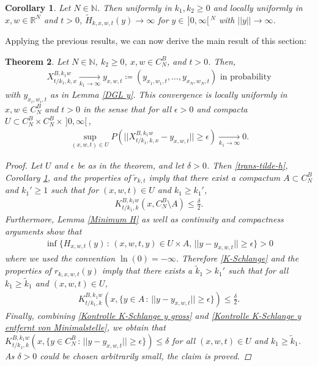 \documentclass[reqno]{amsart}
\theoremstyle{plain}
\newtheorem{theorem}{Theorem}[section]
\newtheorem{corollary}[theorem]{Corollary}
\theoremstyle{definition}
\numberwithin{equation}{section}
\newcommand{\R}{\mathbb{R}}
\newcommand{\N}{\mathbb{N}}
\begin{document}
\begin{corollary}\label{H-Schlange y gross}
Let $N \in \N$. Then uniformly in $k_1,k_2 \geq 0$ and locally uniformly in $x,w \in \R^N$ and $t>0$, 
$\widetilde{H}_{k,x,w,t}(y) \to \infty$ for $y \in \,]0,\infty[\,^N$ with $||y|| \to \infty$.
\end{corollary}


Applying the previous results, we can now derive the main result of this section:


\begin{theorem}\label{schwacher Limes K-Schlange}
Let $N \in \N$,  $k_2 \geq 0$, $x,w \in C_N^B$, and $t >0$. Then, 
\begin{align*}
X_{t/k_1,k,x}^{B,k_1 w} \xrightarrow[k_1 \to \infty]{} y_{x,w,t} \coloneqq (y_{x_1,w_1,t}, \ldots, y_{x_N,w_N,t}) \text{ in probability}
\end{align*}
with $y_{x_i,w_i,t}$ as  in Lemma \ref{DGL y}.
This convergence is locally uniformly in $x,w \in C_N^B$ and $t>0$ in the sense that
 for all $\epsilon>0$ and  compacta $U \subset C_N^B \times C_N^B \times \,]0,\infty[\,$,
\begin{align*}
\sup\limits_{(x,w,t) \in U} P(||X_{t/k_1,k,x}^{B,k_1 w}-y_{x,w,t}|| \geq \epsilon) 
\xrightarrow[k_1 \to \infty]{} 0.
\end{align*}
\begin{proof}
Let $U$ and $\epsilon$ be as in the theorem, and let $\delta>0$.
Then \eqref{trans-tilde-h}, Corollary \ref{H-Schlange y gross}, and the properties of $\widetilde{r}_{k,t}$ imply 
that there exist a compactum $A \subset C_N^B$ and  $k_1' \geq 1$ such that
for  $(x,w,t) \in U$ and $k_1 \geq k_1'$,
\begin{align}
K_{t/k_1,k}^{B,k_1 w}(x,C_N^B \setminus A) \leq \frac{\delta}{2}. \label{Kontrolle K-Schlange y gross}
\end{align}
Furthermore, Lemma \ref{Minimum H} as well as   continuity and compactness arguments show that
\begin{align}
\inf\{H_{x,w,t}(y) \, : \, (x,w,t,y) \in U \times A, \, ||y-y_{x,w,t}|| \geq \epsilon\}>0 \label{H>0}
\end{align}
where we used the convention $\ln(0)=-\infty$.
Therefore \eqref{K-Schlange} and the properties of $r_{k,x,w,t}(y)$ imply that there exists a $\widetilde{k}_1>k_1'$ such that for all $k_1 \geq \widetilde{k}_1$ and $(x,w,t) \in U$, 
\begin{align}
K_{t/k_1,k}^{B,k_1 w}(x,\{y \in A \, : \, ||y-y_{x,w,t}|| \geq \epsilon \}) \leq \frac{\delta}{2}. \label{Kontrolle K-Schlange y entfernt von Minimalstelle}
\end{align}
Finally, combining \eqref{Kontrolle K-Schlange y gross} and \eqref{Kontrolle K-Schlange y entfernt von Minimalstelle},
we obtain that
$K_{t/k_1,k}^{B,k_1 w}(x,\{y \in C_N^B \, : \, ||y-y_{x,w,t}|| \geq \epsilon \}) \leq \delta$
for all $(x,w,t) \in U$ and $k_1 \geq \widetilde{k}_1$.
As $\delta>0$ could be chosen arbitrarily small, the claim is proved.
\end{proof}
\end{theorem}
\end{document}
